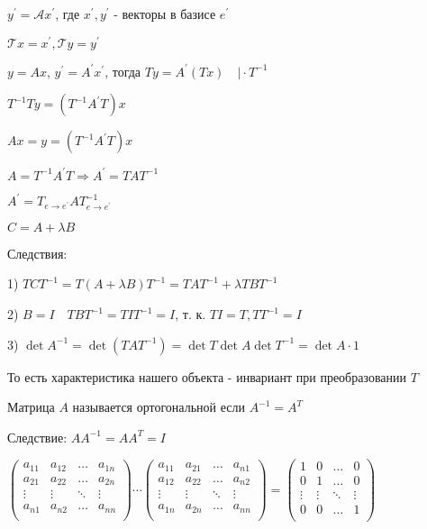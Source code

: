 \documentclass[12pt]{article}
\begin{document}
    $y^\prime = \mathcal{A} x^\prime$, где $x^\prime, y^\prime$ - векторы в базисе $e^\prime$

    $\mathcal{T}x = x^\prime, \mathcal{T}y = y^\prime$

    $y = Ax$, $y^\prime = A^\prime x^\prime$, тогда $Ty = A^\prime (Tx) \quad \Big| \cdot T^{-1}$

    $T^{-1}Ty = (T^{-1}A^\prime T)x$
    
    $Ax = y = (T^{-1}A^\prime T)x$

    $A = T^{-1}A^\prime T \Longrightarrow A^\prime = TA T^{-1}$


    \Th $A^\prime = T_{e\to e^\prime} A T^{-1}_{e\to e^\prime}$

    \Nota $C = A + \lambda B$

    Следствия:

    1) $TCT^{-1} = T (A + \lambda B) T^{-1} = T A T^{-1} + \lambda T B T^{-1}$

    2) $B = I \quad T B T^{-1} = T I T^{-1} = I$, т. к. $TI = T, T T^{-1} = I$

    3) $\det A^{-1} = \det (T A T^{-1}) = \det T \det A \det T^{-1} = \det A \cdot 1$

    \Nota То есть характеристика нашего объекта - инвариант при преобразовании $T$

    \hypertarget{orthogonalmatrix}{}

    \Def Матрица $A$ называется ортогональной если $A^{-1} = A^T$

    Следствие: $AA^{-1} = AA^T = I$

    $\begin{pmatrix}
         a_{11} & a_{12} & \dots & a_{1n} \\
         a_{21} & a_{22} & \dots & a_{2n} \\
         \vdots & \vdots & \ddots & \vdots \\
         a_{n1} & a_{n2} & \dots & a_{nn} \\
    \end{pmatrix} \cdots \begin{pmatrix}
         a_{11} & a_{21} & \dots & a_{n1} \\
         a_{12} & a_{22} & \dots & a_{n2} \\
         \vdots & \vdots & \ddots & \vdots \\
         a_{1n} & a_{2n} & \dots & a_{nn} \\
    \end{pmatrix} = \begin{pmatrix}
         1 & 0 & \dots & 0 \\
         0 & 1 & \dots & 0 \\
         \vdots & \vdots & \ddots & \vdots \\
         0 & 0 & \dots & 1 \\
    \end{pmatrix}$
\end{document}
